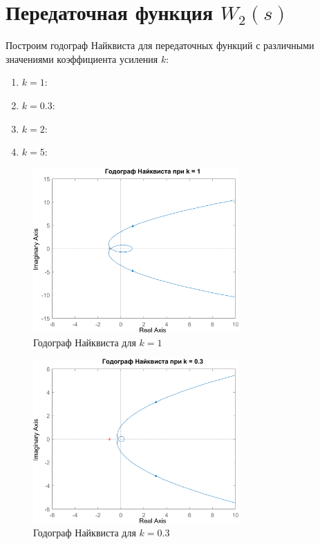 \section{Передаточная функция $W_2(s)$}
Построим годограф Найквиста для передаточных функций с различными значениями коэффициента усиления $k$:
\begin{enumerate}
    \item $k = 1$:
    \item $k = 0.3$:
    \item $k = 2$:
    \item $k = 5$:
\end{enumerate}

\begin{figure}[H]
    \centering
    \centering
    \includegraphics[width=0.7\textwidth, trim={0cm 0cm 0cm 0cm}]{../images/2_2_0_hod.png}
    \caption{Годограф Найквиста для $k = 1$}
\end{figure}

\begin{figure}[H]
    \centering
    \centering
    \includegraphics[width=0.7\textwidth, trim={0cm 0cm 0cm 0cm}]{../images/2_2_1_hod.png}
    \caption{Годограф Найквиста для $k = 0.3$}
\end{figure}

